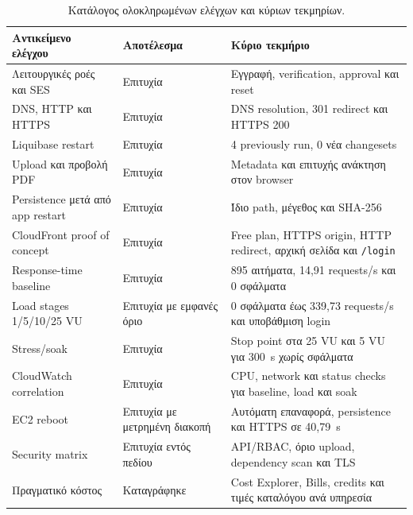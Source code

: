 \begin{table}[htbp]
\centering
\caption{Κατάλογος ολοκληρωμένων ελέγχων και κύριων τεκμηρίων.}
\label{tab:evaluation-status}
\small
\begin{tabularx}{\textwidth}{p{}p{}X}
\toprule
Αντικείμενο ελέγχου & Αποτέλεσμα & Κύριο τεκμήριο \\
\midrule
Λειτουργικές ροές και SES & Επιτυχία & Εγγραφή, verification, approval και reset \\
DNS, HTTP και HTTPS & Επιτυχία & DNS resolution, 301 redirect και HTTPS 200 \\
Liquibase restart & Επιτυχία & 4 previously run, 0 νέα changesets \\
Upload και προβολή PDF & Επιτυχία & Metadata και επιτυχής ανάκτηση στον browser \\
Persistence μετά από app restart & Επιτυχία & Ίδιο path, μέγεθος και SHA-256 \\
CloudFront proof of concept & Επιτυχία & Free plan, HTTPS origin, HTTP redirect, αρχική σελίδα και \texttt{/login} \\
Response-time baseline & Επιτυχία & 895 αιτήματα, 14,91 requests/s και 0 σφάλματα \\
Load stages 1/5/10/25 VU & Επιτυχία με εμφανές όριο & 0 σφάλματα έως 339,73 requests/s και υποβάθμιση login \\
Stress/soak & Επιτυχία & Stop point στα 25 VU και 5 VU για 300~s χωρίς σφάλματα \\
CloudWatch correlation & Επιτυχία & CPU, network και status checks για baseline, load και soak \\
EC2 reboot & Επιτυχία με μετρημένη διακοπή & Αυτόματη επαναφορά, persistence και HTTPS σε 40,79~s \\
Security matrix & Επιτυχία εντός πεδίου & API/RBAC, όριο upload, dependency scan και TLS \\
Πραγματικό κόστος & Καταγράφηκε & Cost Explorer, Bills, credits και τιμές καταλόγου ανά υπηρεσία \\
\bottomrule
\end{tabularx}
\end{table}

